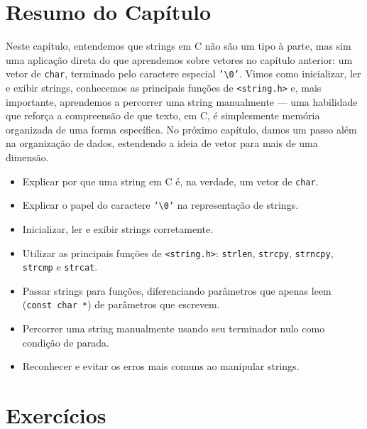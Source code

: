 \section*{Resumo do Capítulo}
Neste capítulo, entendemos que strings em C não são um tipo à parte, mas sim uma aplicação direta do que aprendemos sobre vetores no capítulo anterior: um vetor de \texttt{char}, terminado pelo caractere especial \texttt{'\textbackslash 0'}. Vimos como inicializar, ler e exibir strings, conhecemos as principais funções de \texttt{<string.h>} e, mais importante, aprendemos a percorrer uma string manualmente — uma habilidade que reforça a compreensão de que texto, em C, é simplesmente memória organizada de uma forma específica. No próximo capítulo, damos um passo além na organização de dados, estendendo a ideia de vetor para mais de uma dimensão.

\begin{objetivos}
\begin{itemize}
    \item Explicar por que uma string em C é, na verdade, um vetor de \texttt{char}.
    \item Explicar o papel do caractere \texttt{'\textbackslash 0'} na representação de strings.
    \item Inicializar, ler e exibir strings corretamente.
    \item Utilizar as principais funções de \texttt{<string.h>}: \texttt{strlen}, \texttt{strcpy}, \texttt{strncpy}, \texttt{strcmp} e \texttt{strcat}.
    \item Passar strings para funções, diferenciando parâmetros que apenas leem (\texttt{const char *}) de parâmetros que escrevem.
    \item Percorrer uma string manualmente usando seu terminador nulo como condição de parada.
    \item Reconhecer e evitar os erros mais comuns ao manipular strings.
\end{itemize}
\end{objetivos}

\section*{Exercícios}

